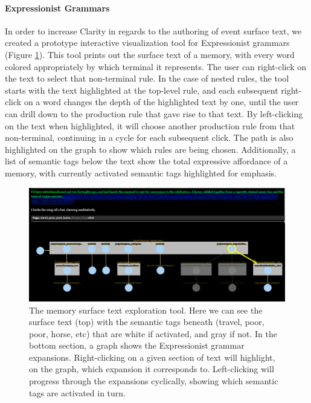 \paragraph{Expressionist Grammars}\label{par:expressionist-grammars}

In order to increase Clarity in regards to the authoring of event surface text, we created a prototype interactive visualization tool for Expressionist grammars (Figure \ref{fig:memory-diagram}). This tool prints out the surface text of a memory, with every word colored appropriately by which terminal it represents. The user can right-click on the text to select that non-terminal rule. In the case of nested rules, the tool starts with the text highlighted at the top-level rule, and each subsequent right-click on a word changes the depth of the highlighted text by one, until the user can drill down to the production rule that gave rise to that text. By left-clicking on the text when highlighted, it will choose another production rule from that non-terminal, continuing in a cycle for each subsequent click. The path is also highlighted on the graph to show which rules are being chosen. Additionally, a list of semantic tags below the text show the total expressive affordance of a memory, with currently activated semantic tags highlighted for emphasis.


\begin{figure}
    \centering
    \includegraphics[width=\textwidth]{figures/4-Delve/memory-diagram.png}
    \caption{The memory surface text exploration tool. Here we can see the surface text (top) with the semantic tags beneath (travel, poor, poor, horse, etc) that are white if activated, and gray if not. In the bottom section, a graph shows the Expressionist grammar expansions. Right-clicking on a given section of text will highlight, on the graph, which expansion it corresponds to. Left-clicking will progress through the expansions cyclically, showing which semantic tags are activated in turn.}
    \label{fig:memory-diagram}
\end{figure}

